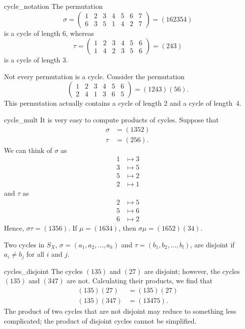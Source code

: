  
\begin{example}{cycle_notation}
The permutation
\[
\sigma =
\begin{pmatrix}
1 & 2 & 3 & 4 & 5 & 6 & 7\\
6 & 3 & 5 & 1 & 4 & 2 & 7
\end{pmatrix}
=
(1 6 2 3 5 4 )
\]
is a cycle of length 6, whereas
\[
\tau =
\begin{pmatrix}
1 & 2 & 3 & 4 & 5 & 6 \\
1 & 4 & 2 & 3 & 5 & 6
\end{pmatrix}
=
(2 4 3)
\]
is a cycle of length 3.
 
 
Not every permutation is a cycle. Consider the permutation
\[
\begin{pmatrix}
1 & 2 & 3 & 4 & 5 & 6 \\
2 & 4 & 1 & 3 & 6 & 5
\end{pmatrix}
 = (1 2 4 3)(5 6).
\]
This permutation actually contains a cycle of length 2 and a cycle
of length~4. 
\hspace*{1in}
\end{example}
 
 
\begin{example}{cycle_mult}
It is very easy to compute products of cycles. Suppose that
\begin{align*}
\sigma & = (1 3 5 2 ) \\
\tau   & = (2 5 6).
\end{align*}
We can think of $\sigma$ as
\begin{align*}
1 & \mapsto  3 \\
3 & \mapsto  5 \\
5 & \mapsto  2 \\
2 & \mapsto  1
\end{align*}
and $\tau$ as
\begin{align*}
2 & \mapsto  5 \\
5 & \mapsto  6 \\
6 & \mapsto  2
\end{align*}
Hence, $\sigma \tau =  (1 3 5 6 )$.
If $\mu = (1634)$, then $\sigma \mu = (1 6 5 2)(3 4)$.
\end{example}
 
 
Two cycles in $S_X$, $\sigma = (a_1, a_2, \ldots, a_k )$ and $\tau =
(b_1, b_2, \ldots, b_l )$, are {\bfi disjoint}
if $a_i \neq b_j$ for all $i$ and $j$. 
 
\begin{example}{cycles_disjoint}
The  cycles $(1 3 5)$ and $(2 7 )$ are disjoint; however, the cycles
$(1 3 5)$ and $(3 4 7 )$ are not.  Calculating their products, we find
that 
\begin{align*}
(1 3 5)(2 7 ) & = (1 3 5)(2 7 ) \\
(1 3 5)(3 4 7 ) & = (1 3 4 7 5).
\end{align*}
The product of two cycles that are not disjoint may reduce to
something less complicated; the product of disjoint cycles cannot be 
simplified. 
\end{example}
 
